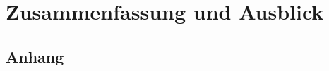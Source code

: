 \documentclass[
    11pt, %
    DIV=11,
    ngerman, %
    a4paper, %
    oneside, %
    titlepage, %
    parskip=half, %
    headings=normal, %
    listof=totoc, %
    bibliography=totoc, %
    index=totoc, %
    captions=tableheading, %
    final %
]{scrreprt}
\begin{document}
\chapter{Zusammenfassung und Ausblick}
	



\begin{appendix}
    \clearpage
    \chapter{Anhang}
    \label{sec:Anhang}
    \setdefaultleftmargin{1em}{}{}{}{}{}
    
\end{appendix}

\end{document}
